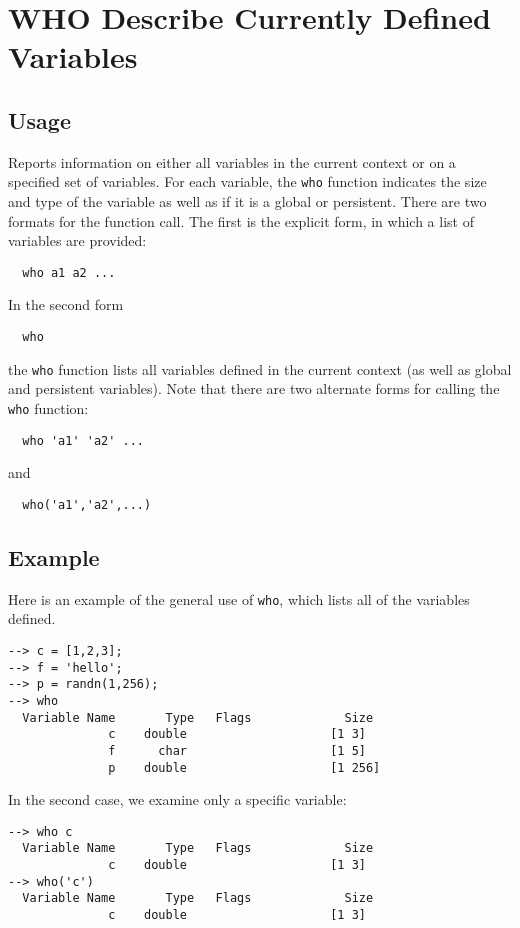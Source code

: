 \section{WHO Describe Currently Defined Variables}

\subsection{Usage}

Reports information on either all variables in the current context
or on a specified set of variables.  For each variable, the \verb|who|
function indicates the size and type of the variable as well as 
if it is a global or persistent.  There are two formats for the 
function call.  The first is the explicit form, in which a list
of variables are provided:
\begin{verbatim}
  who a1 a2 ...
\end{verbatim}
In the second form
\begin{verbatim}
  who
\end{verbatim}
the \verb|who| function lists all variables defined in the current 
context (as well as global and persistent variables). Note that
there are two alternate forms for calling the \verb|who| function:
\begin{verbatim}
  who 'a1' 'a2' ...
\end{verbatim}
and
\begin{verbatim}
  who('a1','a2',...)
\end{verbatim}
\subsection{Example}

Here is an example of the general use of \verb|who|, which lists all of the variables defined.
\begin{verbatim}
--> c = [1,2,3];
--> f = 'hello';
--> p = randn(1,256);
--> who
  Variable Name       Type   Flags             Size
              c    double                    [1 3]
              f      char                    [1 5]
              p    double                    [1 256]
\end{verbatim}
In the second case, we examine only a specific variable:
\begin{verbatim}
--> who c
  Variable Name       Type   Flags             Size
              c    double                    [1 3]
--> who('c')
  Variable Name       Type   Flags             Size
              c    double                    [1 3]
\end{verbatim}
